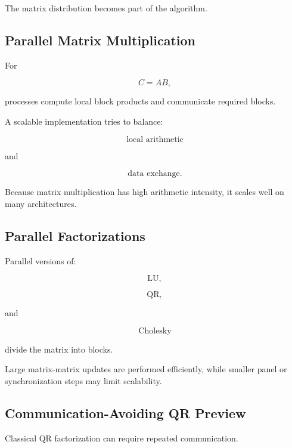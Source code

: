 The matrix distribution becomes part of the algorithm.

\subsection{Parallel Matrix Multiplication}
\label{subsec:parallel-matrix-multiplication}

For

\[
C=AB,
\]

processes compute local block products and communicate required blocks.

A scalable implementation tries to balance:

\[
\boxed{
\text{local arithmetic}
}
\]

and

\[
\boxed{
\text{data exchange}.
}
\]

Because matrix multiplication has high arithmetic intensity, it scales
well on many architectures.

\subsection{Parallel Factorizations}
\label{subsec:parallel-factorizations}

Parallel versions of:

\[
\boxed{
\text{LU},
}
\]

\[
\boxed{
\text{QR},
}
\]

and

\[
\boxed{
\text{Cholesky}
}
\]

divide the matrix into blocks.

Large matrix-matrix updates are performed efficiently, while smaller panel
or synchronization steps may limit scalability.

\subsection{Communication-Avoiding QR Preview}
\label{subsec:communication-avoiding-qr}

Classical QR factorization can require repeated communication.

